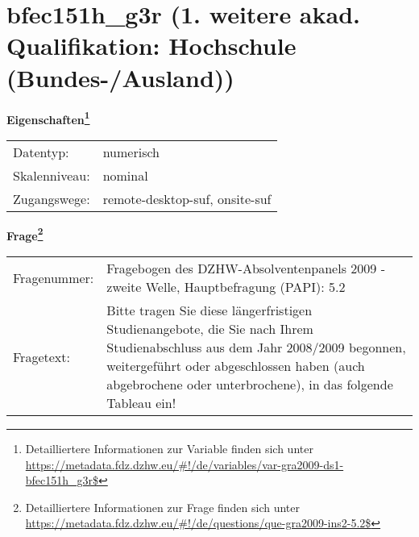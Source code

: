 
    \setcounter{footnote}{0}

    \vspace*{-1.8cm}
	\section{bfec151h\_g3r (1. weitere akad. Qualifikation: Hochschule (Bundes-/Ausland))}
	\label{section:bfec151h_g3r}



    \vspace*{0.5cm}
    \noindent\textbf{Eigenschaften\footnote{Detailliertere Informationen zur Variable finden sich unter
		\url{https://metadata.fdz.dzhw.eu/\#!/de/variables/var-gra2009-ds1-bfec151h_g3r$}}}\\
	\begin{tabularx}{\hsize}{@{}lX}
	Datentyp: & numerisch \\
	Skalenniveau: & nominal \\
	Zugangswege: &
	  remote-desktop-suf, 
	  onsite-suf
 \\
    \end{tabularx}



				\vspace*{0.5cm}
                \noindent\textbf{Frage\footnote{Detailliertere Informationen zur Frage finden sich unter
		              \url{https://metadata.fdz.dzhw.eu/\#!/de/questions/que-gra2009-ins2-5.2$}}}\\
				\begin{tabularx}{\hsize}{@{}lX}
					Fragenummer: &
					  Fragebogen des DZHW-Absolventenpanels 2009 - zweite Welle, Hauptbefragung (PAPI):
					  5.2
 \\
					Fragetext: & Bitte tragen Sie diese längerfristigen Studienangebote, die Sie nach Ihrem Studienabschluss aus dem Jahr 2008/2009 begonnen, weitergeführt oder abgeschlossen haben (auch abgebrochene oder unterbrochene), in das folgende Tableau ein! \\
				\end{tabularx}





